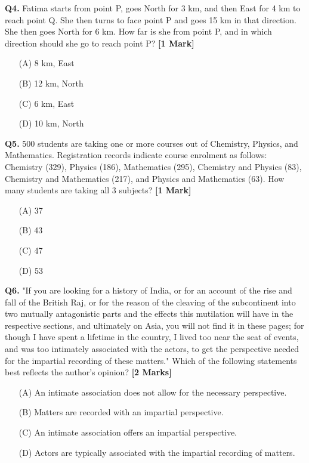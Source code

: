 \documentclass[11pt]{article}
\newcommand{\questiona}[2]{
    \noindent\textbf{Q#2.} #1 \hfill \textbf{[1 Mark]}
}
\newcommand{\questionb}[2]{
    \noindent\textbf{Q#2.} #1 \hfill \textbf{[2 Marks]}
}
\begin{document}
\questiona{Fatima starts from point P, goes North for 3 km, and then East for 4 km to reach point Q. She then turns to face point P and goes 15 km in that direction. She then goes North for 6 km. How far is she from point P, and in which direction should she go to reach point P?}{4}
\begin{enumerate}
    \item[(A)] 8 km, East  
    \item[(B)] 12 km, North  
    \item[(C)] 6 km, East  
    \item[(D)] 10 km, North  
\end{enumerate}
\vspace{0.5cm}

\questiona{500 students are taking one or more courses out of Chemistry, Physics, and Mathematics. Registration records indicate course enrolment as follows: Chemistry (329), Physics (186), Mathematics (295), Chemistry and Physics (83), Chemistry and Mathematics (217), and Physics and Mathematics (63). How many students are taking all 3 subjects?}{5}
\begin{enumerate}
    \item[(A)] 37  
    \item[(B)] 43  
    \item[(C)] 47  
    \item[(D)] 53  
\end{enumerate}
\vspace{0.5cm}

\questionb{"If you are looking for a history of India, or for an account of the rise and fall of the British Raj, or for the reason of the cleaving of the subcontinent into two mutually antagonistic parts and the effects this mutilation will have in the respective sections, and ultimately on Asia, you will not find it in these pages; for though I have spent a lifetime in the country, I lived too near the seat of events, and was too intimately associated with the actors, to get the perspective needed for the impartial recording of these matters." Which of the following statements best reflects the author's opinion?}{6}
\begin{enumerate}
    \item[(A)] An intimate association does not allow for the necessary perspective.
    \item[(B)] Matters are recorded with an impartial perspective.
    \item[(C)] An intimate association offers an impartial perspective.
    \item[(D)] Actors are typically associated with the impartial recording of matters.
\end{enumerate}
\vspace{0.5cm}
\end{document}
